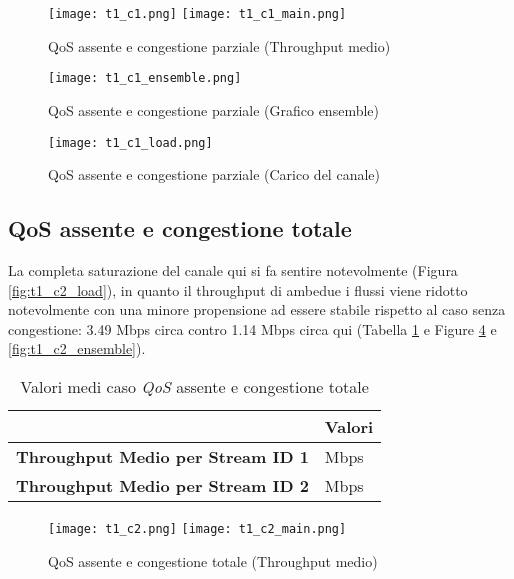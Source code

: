 \begin{figure}[h!]
    \centering
    \texttt{[image: t1\_c1.png]}
    \texttt{[image: t1\_c1\_main.png]}
    \caption{QoS assente e congestione parziale (Throughput medio)}
    \label{fig:t1_c1}
\end{figure}

\begin{figure}[h!]
    \centering
    \texttt{[image: t1\_c1\_ensemble.png]}
    \caption{QoS assente e congestione parziale (Grafico ensemble)}
    \label{fig:t1_c1_ensemble}
\end{figure}
\clearpage
\begin{figure}[h!]
    \centering
    \texttt{[image: t1\_c1\_load.png]}
    \caption{QoS assente e congestione parziale (Carico del canale)}
    \label{fig:t1_c1_load}
\end{figure}
\newpage
\subsection[QoS assente e congestione totale]{QoS assente e congestione totale}
La completa saturazione del canale qui si fa sentire notevolmente (Figura \ref{fig:t1_c2_load}), in quanto il throughput di ambedue i flussi viene ridotto notevolmente con una minore propensione ad essere stabile rispetto al caso senza congestione: 3.49 Mbps circa contro 1.14 Mbps circa qui (Tabella \ref{table:8} e Figure \ref{fig:t1_c2} e \ref{fig:t1_c2_ensemble}).
\begin{table}[h!]
    \centering
    \begin{tabular}{|>{\centering\arraybackslash}p{20em}|>{\centering\arraybackslash}p{7em}|} 
     \hline
     \textbf{} & \textbf{Valori} \\ 
     \hline
     \textbf{Throughput Medio per Stream ID 1} & 1.14 Mbps \\ 
     \hline
     \textbf{Throughput Medio per Stream ID 2} & 1.19 Mbps \\
     \hline
    \end{tabular}
    \caption{Valori medi caso \textit{QoS} assente e congestione totale}
    \label{table:8}
\end{table}

\begin{figure}[h!]
    \centering
    \texttt{[image: t1\_c2.png]}
    \texttt{[image: t1\_c2\_main.png]}
    \caption{QoS assente e congestione totale (Throughput medio)}
    \label{fig:t1_c2}
\end{figure}

